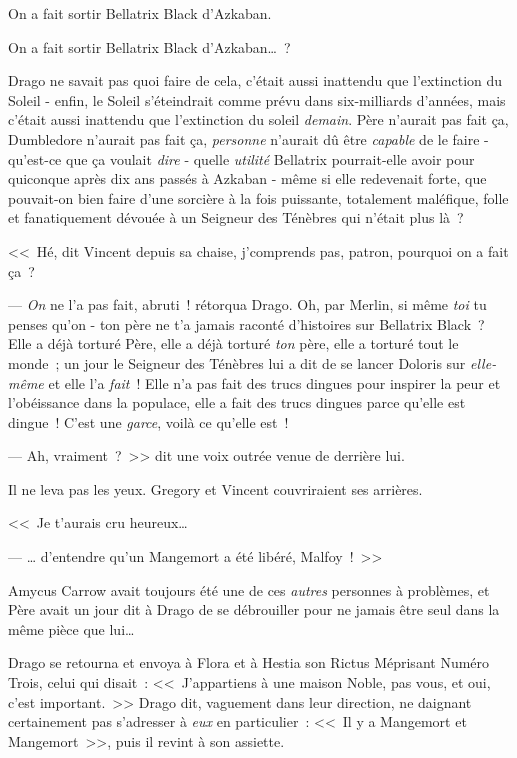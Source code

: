 On a fait sortir Bellatrix Black d'Azkaban.

On a fait sortir Bellatrix Black d'Azkaban…~?

Drago ne savait pas quoi faire de cela, c'était aussi inattendu que l'extinction du Soleil - enfin, le Soleil s'éteindrait comme prévu dans six-milliards d'années, mais c'était aussi inattendu que l'extinction du soleil \emph{demain}. Père n'aurait pas fait ça, Dumbledore n'aurait pas fait ça, \emph{personne} n'aurait dû être \emph{capable} de le faire - qu'est-ce que ça voulait \emph{dire} - quelle \emph{utilité} Bellatrix pourrait-elle avoir pour quiconque après dix ans passés à Azkaban - même si elle redevenait forte, que pouvait-on bien faire d'une sorcière à la fois puissante, totalement maléfique, folle et fanatiquement dévouée à un Seigneur des Ténèbres qui n'était plus là~?

<<~Hé, dit Vincent depuis sa chaise, j'comprends pas, patron, pourquoi on a fait ça~?

--- \emph{On} ne l'a pas fait, abruti~! rétorqua Drago. Oh, par Merlin, si même \emph{toi} tu penses qu'on - ton père ne t'a jamais raconté d'histoires sur Bellatrix Black~? Elle a déjà torturé Père, elle a déjà torturé \emph{ton} père, elle a torturé tout le monde~; un jour le Seigneur des Ténèbres lui a dit de se lancer Doloris sur \emph{elle-même} et elle l'a \emph{fait}~! Elle n'a pas fait des trucs dingues pour inspirer la peur et l'obéissance dans la populace, elle a fait des trucs dingues parce qu'elle est dingue~! C'est une \emph{garce}, voilà ce qu'elle est~!

--- Ah, vraiment~?~>> dit une voix outrée venue de derrière lui.

Il ne leva pas les yeux. Gregory et Vincent couvriraient ses arrières.

<<~Je t'aurais cru heureux…

--- … d'entendre qu'un Mangemort a été libéré, Malfoy~!~>>

Amycus Carrow avait toujours été une de ces \emph{autres} personnes à problèmes, et Père avait un jour dit à Drago de se débrouiller pour ne jamais être seul dans la même pièce que lui…

Drago se retourna et envoya à Flora et à Hestia son Rictus Méprisant Numéro Trois, celui qui disait~: <<~J'appartiens à une maison Noble, pas vous, et oui, c'est important.~>> Drago dit, vaguement dans leur direction, ne daignant certainement pas s'adresser à \emph{eux} en particulier~: <<~Il y a Mangemort et Mangemort~>>, puis il revint à son assiette.

